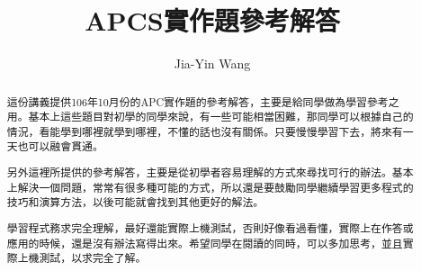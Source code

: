 \documentclass[12pt,a4paper]{article}
\begin{document}
\title{APCS實作題參考解答}
\author{Jia-Yin Wang}
\maketitle

\begin{abstract}
這份講義提供106年10月份的APC實作題的參考解答，主要是給同學做為學習參考之用。基本上這些題目對初學的同學來說，有一些可能相當困難，那同學可以根據自己的情況，看能學到哪裡就學到哪裡，不懂的話也沒有關係。只要慢慢學習下去，將來有一天也可以融會貫通。

另外這裡所提供的參考解答，主要是從初學者容易理解的方式來尋找可行的辦法。基本上解決一個問題，常常有很多種可能的方式，所以還是要鼓勵同學繼續學習更多程式的技巧和演算方法，以後可能就會找到其他更好的解法。

學習程式務求完全理解，最好還能實際上機測試，否則好像看過看懂，實際上在作答或應用的時候，還是沒有辦法寫得出來。希望同學在閱讀的同時，可以多加思考，並且實際上機測試，以求完全了解。
\end{abstract}
%
%


\newpage

\newpage

\newpage

\end{document}
